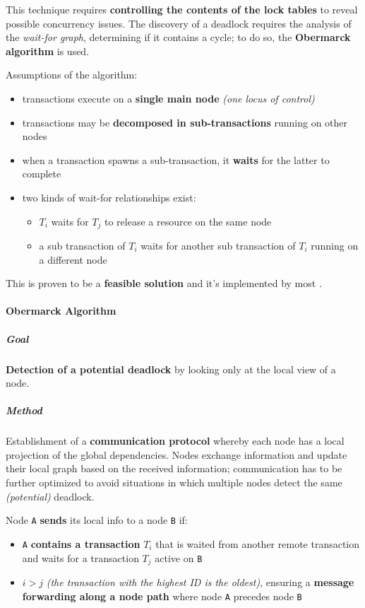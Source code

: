 \documentclass[english]{article}
\begin{document}
This technique requires \textbf{controlling the contents of the lock tables} to reveal possible concurrency issues.
The discovery of a deadlock requires the analysis of the \textit{wait-for graph}, determining if it contains a cycle;
to do so, the \textbf{Obermarck algorithm} is used.

Assumptions of the algorithm:

\begin{itemize}
  \item transactions execute on a \textbf{single main node} \textit{(one locus of control)}
  \item transactions may be \textbf{decomposed in sub-transactions} running on other nodes
  \item when a transaction spawns a sub-transaction, it \textbf{waits} for the latter to complete
  \item two kinds of wait-for relationships exist:
        \begin{itemize}
          \item \(T_i\) waits for \(T_j\) to release a resource on the same node
          \item a sub transaction of \(T_i\) waits for another sub transaction of \(T_i\) running on a different node
        \end{itemize}
\end{itemize}

This is proven to be a \textbf{feasible solution} and it's implemented by most \dbms.

\paragraph{Obermarck Algorithm}

\subparagraph*{Goal}
\textbf{Detection of a potential deadlock} by looking only at the local view of a node.

\subparagraph*{Method}
Establishment of a \textbf{communication protocol} whereby each node has a local projection of the global dependencies.
Nodes exchange information and update their local graph based on the received information;
communication has to be further optimized to avoid situations in which multiple nodes detect the same \textit{(potential)} deadlock.

\bigskip
Node \texttt{A} \textbf{sends} its local info to a node \texttt{B} if:

\begin{itemize}
  \item \texttt{A} \textbf{contains a transaction} \(T_i\) that is waited from another remote transaction and waits for a transaction \(T_j\) active on \texttt{B}
  \item \(i > j\) \textit{(the transaction with the highest ID is the oldest)}, ensuring a \textbf{message forwarding along a node path} where node \texttt{A} precedes node \texttt{B}
\end{itemize}
\end{document}
